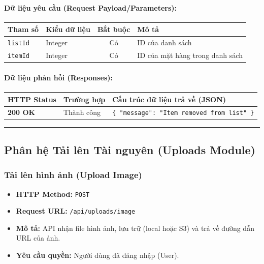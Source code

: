\documentclass[12pt,a4paper]{article}
\begin{document}
\paragraph{Dữ liệu yêu cầu (Request Payload/Parameters):}
\begin{longtable}{|>{\raggedright\arraybackslash}p{2.8cm}|>{\raggedright\arraybackslash}p{2.2cm}|c|>{\raggedright\arraybackslash}p{7.0cm}|}
\hline
\textbf{Tham số} & \textbf{Kiểu dữ liệu} & \textbf{Bắt buộc} & \textbf{Mô tả} \\ \hline
\endhead
\texttt{listId} & Integer & Có & ID của danh sách \\ \hline
\texttt{itemId} & Integer & Có & ID của mặt hàng trong danh sách \\ \hline
\end{longtable}

\paragraph{Dữ liệu phản hồi (Responses):}
\begin{longtable}{|>{\raggedright\arraybackslash}p{2.8cm}|>{\raggedright\arraybackslash}p{3.2cm}|>{\raggedright\arraybackslash}p{8.0cm}|}
\hline
\textbf{HTTP Status} & \textbf{Trường hợp} & \textbf{Cấu trúc dữ liệu trả về (JSON)} \\ \hline
\endhead
\textbf{200 OK} & Thành công & \texttt{\{ "message": "Item removed from list" \}} \\ \hline
\end{longtable}

\vskip 0.4cm
\noindent\rule{\textwidth}{0.3pt}
\vskip 0.4cm

\subsection{Phân hệ Tải lên Tài nguyên (Uploads Module)}

\subsubsection{Tải lên hình ảnh (Upload Image)}
\begin{itemize}[leftmargin=*]
    \item \textbf{HTTP Method:} \texttt{POST}
    \item \textbf{Request URL:} \texttt{/api/uploads/image}
    \item \textbf{Mô tả:} API nhận file hình ảnh, lưu trữ (local hoặc S3) và trả về đường dẫn URL của ảnh.
    \item \textbf{Yêu cầu quyền:} Người dùng đã đăng nhập (User).
\end{itemize}
\end{document}
